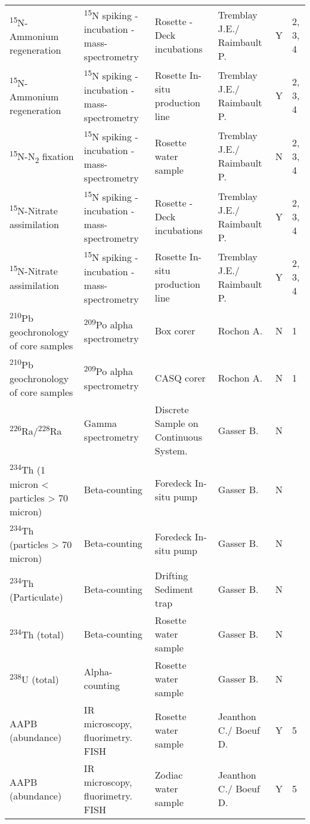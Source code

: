 \begin{ThreePartTable}
\begin{longtable}[t]{llllll}
\textsuperscript{15}N-Ammonium regeneration & \textsuperscript{15}N spiking - incubation - mass-spectrometry & Rosette - Deck incubations & Tremblay J.E./ Raimbault P. & Y & 2, 3, 4\\
\addlinespace
\textsuperscript{15}N-Ammonium regeneration & \textsuperscript{15}N spiking - incubation - mass-spectrometry & Rosette In-situ production line & Tremblay J.E./ Raimbault P. & Y & 2, 3, 4\\
\textsuperscript{15}N-N\textsubscript{2} fixation & \textsuperscript{15}N spiking - incubation - mass-spectrometry & Rosette water sample & Tremblay J.E./ Raimbault P. & N & 2, 3, 4\\
\textsuperscript{15}N-Nitrate assimilation & \textsuperscript{15}N spiking - incubation - mass-spectrometry & Rosette - Deck incubations & Tremblay J.E./ Raimbault P. & Y & 2, 3, 4\\
\textsuperscript{15}N-Nitrate assimilation & \textsuperscript{15}N spiking - incubation - mass-spectrometry & Rosette In-situ production line & Tremblay J.E./ Raimbault P. & Y & 2, 3, 4\\
\textsuperscript{210}Pb geochronology of core samples & \textsuperscript{209}Po alpha spectrometry & Box corer & Rochon A. & N & 1\\
\addlinespace
\textsuperscript{210}Pb geochronology of core samples & \textsuperscript{209}Po alpha spectrometry & CASQ corer & Rochon A. & N & 1\\
\textsuperscript{226}Ra/\textsuperscript{228}Ra & Gamma spectrometry & Discrete Sample on Continuous System. & Gasser B. & N & \\
\textsuperscript{234}Th (1 micron < particles > 70 micron) & Beta-counting & Foredeck In-situ pump & Gasser B. & N & \\
\textsuperscript{234}Th (particles > 70 micron) & Beta-counting & Foredeck In-situ pump & Gasser B. & N & \\
\textsuperscript{234}Th (Particulate) & Beta-counting & Drifting Sediment trap & Gasser B. & N & \\
\addlinespace
\textsuperscript{234}Th (total) & Beta-counting & Rosette water sample & Gasser B. & N & \\
\textsuperscript{238}U (total) & Alpha-counting & Rosette water sample & Gasser B. & N & \\
AAPB (abundance) & IR microscopy, fluorimetry. FISH & Rosette water sample & Jeanthon C./ Boeuf D. & Y & 5\\
AAPB (abundance) & IR microscopy, fluorimetry. FISH & Zodiac water sample & Jeanthon C./ Boeuf D. & Y & 5\\

\end{longtable}
\end{ThreePartTable}
